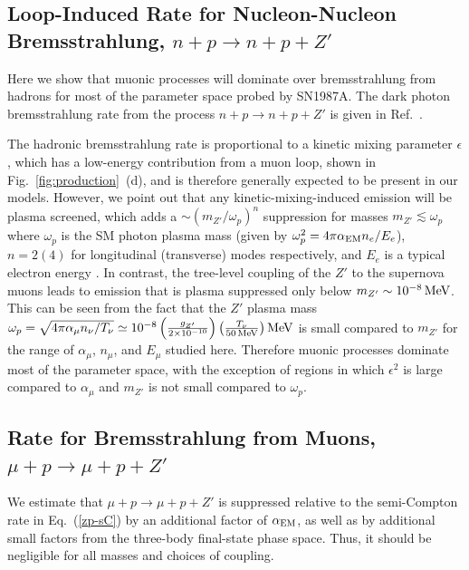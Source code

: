\documentclass[11pt]{article}
\newcommand{\ep}{\epsilon} \newcommand{\vp}{\varphi} \newcommand{\half}{\frac12}
\newcommand{\pL}{\left(} \newcommand{\pR}{\right)} \newcommand{\bL}{\left[} \newcommand{\bR}{\right]} \newcommand{\cbL}{\left\{} \newcommand{\cbR}{\right\}} \newcommand{\mL}{\left|} \newcommand{\mR}{\right|}
\newcommand{\tenx}[1]{\times 10^{#1}}
\newcommand{\Eq}[1]{Eq.~(\ref{#1})} \newcommand{\Eqs}[2]{Eqs.~(\ref{#1}) and (\ref{#2})} \newcommand{\Eqm}[2]{Eqs.~(\ref{#1}) through (\ref{#2})}
\newcommand{\Fig}[1]{Fig.~\ref{#1}} \newcommand{\Figs}[2]{Figs.~\ref{#1} and \ref{#2}}
\begin{document}
\subsection{Loop-Induced Rate for Nucleon-Nucleon Bremsstrahlung, $n+p\rightarrow n+p+Z'$}
Here we show that muonic processes will dominate over bremsstrahlung from hadrons for most of the parameter space probed by SN1987A.  %
The dark photon bremsstrahlung rate from the process $n+p\rightarrow n+p+Z'$ is given in Ref.~\cite{Chang:2016ntp}.

The hadronic bremsstrahlung rate is proportional to a kinetic mixing parameter $\epsilon$, which has a low-energy contribution from a muon loop, shown in \Fig{fig:production}~(d), and is therefore generally expected to be present in our models. However, we point out that any kinetic-mixing-induced emission will be plasma screened, which adds a $\sim (m_{Z'}/\omega_p)^n$ suppression for masses $m_{Z'} \lesssim \omega_p$ where $\omega_p$ is the SM photon plasma mass (given by $\omega_p^2=4\pi \alpha_{\rm EM} n_e/E_e$),  $n=2 (4)$ for longitudinal (transverse) modes respectively, and $E_e$ is a typical electron energy \cite{Chang:2016ntp}. 
In contrast, the tree-level coupling of the $Z'$ to the supernova muons leads to emission that is plasma suppressed only below $m_{Z'} \sim 10^{-8} \operatorname{MeV}$. This can be seen from the fact that 
the $Z'$ plasma mass $\omega_p= \sqrt{4\pi \alpha_{\mu} n_\nu/T_\nu} \simeq 10^{-8} \pL \frac{g_{Z'}}{2\tenx{-10}} \pR \pL \frac{T_\nu}{50\mev} \pR \mev$ is small compared to $m_{Z'}$ for
the range of $\alpha_{\mu}$, $n_\mu$, and $E_\mu$ studied here. Therefore muonic processes dominate most of the parameter space, with the exception of regions in which $\ep^2$ is large compared to $\alpha_{\mu}$ and $m_{Z'}$ is not small compared to $\omega_p$.


\subsection{Rate for Bremsstrahlung from Muons, $\mu+p\rightarrow \mu+p+Z'$}
 
We estimate that $\mu+p\rightarrow \mu+p+Z'$ is suppressed relative to the semi-Compton rate in \Eq{zp-sC} by an additional factor of $\alpha_{\rm EM}$, as well as by additional small factors from the three-body final-state phase space. Thus, it should be negligible for all masses and choices of coupling.

 





\end{document}
